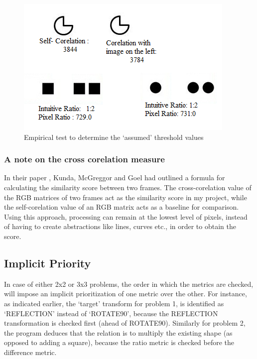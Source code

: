 \documentclass[10pt, letter]{article}
\begin{document}
\begin{figure}[h!]
  \centering
    \includegraphics[scale = 0.5]{Images/Fig12}
    \caption{Empirical test to determine the `assumed' threshold values}
  \label{fig12}
\end{figure}

\subsubsection*{A note on the cross corelation measure}
In their paper \cite{paper}, Kunda, McGreggor and Goel had outlined a formula for calculating the similarity score between two frames. The cross-corelation value of the RGB matrices of two frames act as the similarity score in my project, while the self-corelation value of an RGB matrix acts as a baseline for comparison. Using this approach, processing can remain at the lowest level of pixels, instead of having to create abstractions like lines, curves etc., in order to obtain the score.

\subsection*{Implicit Priority}
In case of either 2x2 or 3x3 problems, the order in which the metrics are checked, will impose an implicit prioritization of one metric over the other. For instance, as indicated earlier, the `target' transform for problem 1, is identified as `REFLECTION' instead of `ROTATE90', because the REFLECTION transformation is checked first (ahead of ROTATE90). Similarly for problem 2, the program deduces that the relation is to multiply the existing shape (as opposed to adding a square), because the ratio metric is checked before the difference metric.
\end{document}
